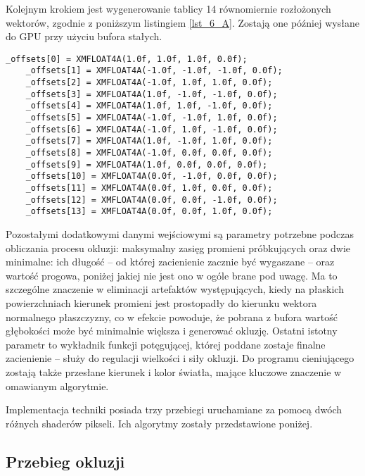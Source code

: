 	Kolejnym krokiem jest wygenerowanie tablicy 14 równomiernie rozłożonych wektorów, zgodnie z poniższym listingiem \ref{lst_6_A}. Zostają one później wysłane do GPU przy użyciu bufora stałych.\pagebreak
	
	\begin{lstlisting}[language=HLSL,caption={Generowanie równomiernie rozłożonych wektorów.},label={lst_6_A}]
	_offsets[0] = XMFLOAT4A(1.0f, 1.0f, 1.0f, 0.0f);
	_offsets[1] = XMFLOAT4A(-1.0f, -1.0f, -1.0f, 0.0f);
	_offsets[2] = XMFLOAT4A(-1.0f, 1.0f, 1.0f, 0.0f);
	_offsets[3] = XMFLOAT4A(1.0f, -1.0f, -1.0f, 0.0f);
	_offsets[4] = XMFLOAT4A(1.0f, 1.0f, -1.0f, 0.0f);
	_offsets[5] = XMFLOAT4A(-1.0f, -1.0f, 1.0f, 0.0f);
	_offsets[6] = XMFLOAT4A(-1.0f, 1.0f, -1.0f, 0.0f);
	_offsets[7] = XMFLOAT4A(1.0f, -1.0f, 1.0f, 0.0f);
	_offsets[8] = XMFLOAT4A(-1.0f, 0.0f, 0.0f, 0.0f);
	_offsets[9] = XMFLOAT4A(1.0f, 0.0f, 0.0f, 0.0f);
	_offsets[10] = XMFLOAT4A(0.0f, -1.0f, 0.0f, 0.0f);
	_offsets[11] = XMFLOAT4A(0.0f, 1.0f, 0.0f, 0.0f);
	_offsets[12] = XMFLOAT4A(0.0f, 0.0f, -1.0f, 0.0f);
	_offsets[13] = XMFLOAT4A(0.0f, 0.0f, 1.0f, 0.0f);
	\end{lstlisting}
	\raggedbottom
	Pozostałymi dodatkowymi danymi wejściowymi są parametry potrzebne podczas obliczania procesu okluzji: maksymalny zasięg promieni próbkujących oraz dwie minimalne: ich długość -- od której zacienienie zacznie być wygaszane -- oraz wartość progowa, poniżej jakiej nie jest ono w ogóle brane pod uwagę. Ma to szczególne znaczenie w eliminacji artefaktów występujących, kiedy na płaskich powierzchniach kierunek promieni jest prostopadły do kierunku wektora normalnego płaszczyzny, co w efekcie powoduje, że pobrana z bufora wartość głębokości może być minimalnie większa i generować okluzję. Ostatni istotny parametr to wykładnik funkcji potęgującej, której poddane zostaje finalne zacienienie -- służy do regulacji wielkości i siły okluzji. Do programu cieniującego zostają także przesłane kierunek i kolor światła, mające kluczowe znaczenie w omawianym algorytmie.
	
	Implementacja techniki posiada trzy przebiegi uruchamiane za pomocą dwóch różnych shaderów pikseli. Ich algorytmy zostały przedstawione poniżej.\pagebreak
	
	\subsection{Przebieg okluzji}
	\label{t:impl:a:pass1}
	

